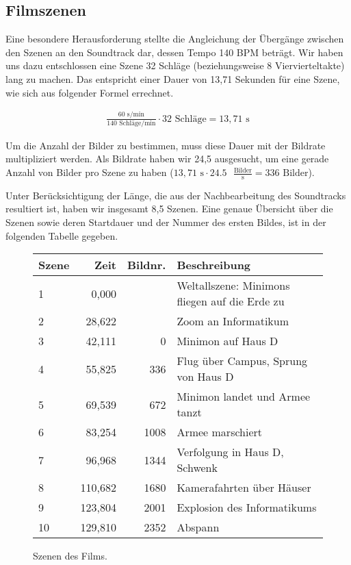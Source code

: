 \subsection{Filmszenen}

Eine besondere Herausforderung stellte die Angleichung der Übergänge zwischen den Szenen an den Soundtrack dar, dessen Tempo 140 BPM beträgt. Wir haben uns dazu entschlossen eine Szene 32 Schläge (beziehungsweise 8 Viervierteltakte) lang zu machen. Das entspricht einer Dauer von 13,71 Sekunden für eine Szene, wie sich aus folgender Formel errechnet.

\begin{align*}
	\frac{60 \text{ s/min}}{140 \text{ Schläge/min}} \cdot 32 \text{ Schläge} = 13,71 \text{ s}
\end{align*}

Um die Anzahl der Bilder zu bestimmen, muss diese Dauer mit der Bildrate multipliziert werden. Als Bildrate haben wir 24,5 ausgesucht, um eine gerade Anzahl von Bilder pro Szene zu haben ($13,71 \text{ s} \cdot 24.5\text{ } \frac{\text{Bilder}}{\text{s}} = 336 \text{ Bilder}$).

Unter Berücksichtigung der Länge, die aus der Nachbearbeitung des Soundtracks resultiert ist, haben wir insgesamt 8,5 Szenen. Eine genaue Übersicht über die Szenen sowie deren Startdauer und der Nummer des ersten Bildes, ist in der folgenden Tabelle gegeben.

\begin{figure}[h]
	\begin{tabular}{p{1cm}rrp{9cm}}
		\textbf{Szene} & \textbf{Zeit} & \textbf{Bildnr.} & \textbf{Beschreibung} \\
		\hline
		1 & 0,000 & & Weltallszene: Minimons fliegen auf die Erde zu\\
		2 & 28,622 & & Zoom an Informatikum\\
		3 & 42,111 & 0 & Minimon auf Haus D\\
		4 & 55,825 & 336 & Flug über Campus, Sprung von Haus D\\
		5 & 69,539 & 672 & Minimon landet und Armee tanzt\\
		6 & 83,254 & 1008 & Armee marschiert\\
		7 & 96,968 & 1344 & Verfolgung in Haus D, Schwenk\\
		8 & 110,682 & 1680 & Kamerafahrten über Häuser\\
		9 & 123,804 & 2001 & Explosion des Informatikums\\
		10 & 129,810 & 2352 & Abspann\\
	\end{tabular}
	\caption{Szenen des Films.}
	\label{fig:scenes}
\end{figure}
